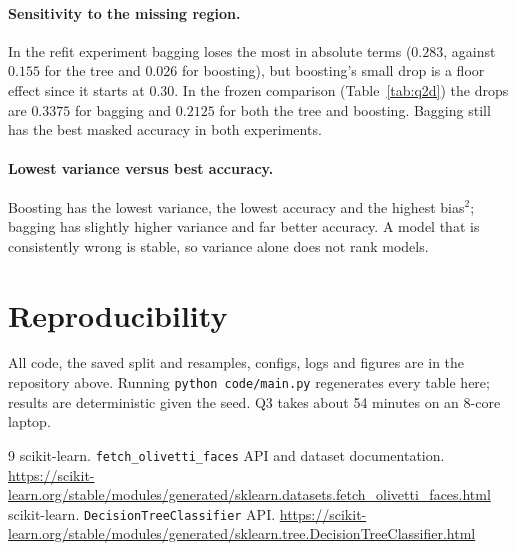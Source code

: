 \documentclass[10pt,twocolumn,letterpaper]{article}
\begin{document}
\paragraph{Sensitivity to the missing region.}
In the refit experiment bagging loses the most in absolute terms ($0.283$, against $0.155$ for the tree and $0.026$ for boosting), but boosting's small drop is a floor effect since it starts at $0.30$.
In the frozen comparison (Table~\ref{tab:q2d}) the drops are $0.3375$ for bagging and $0.2125$ for both the tree and boosting. Bagging still has the best masked accuracy in both experiments.

\paragraph{Lowest variance versus best accuracy.}
Boosting has the lowest variance, the lowest accuracy and the highest bias$^2$; bagging has slightly higher variance and far better accuracy.
A model that is consistently wrong is stable, so variance alone does not rank models.

\section{Reproducibility}
All code, the saved split and resamples, configs, logs and figures are in the repository above. Running \texttt{python code/main.py} regenerates every table here;
results are deterministic given the seed. Q3 takes about 54 minutes on an 8-core laptop.

{\small
\begin{thebibliography}{9}
 scikit-learn. \texttt{fetch\_olivetti\_faces} API and dataset documentation. \url{https://scikit-learn.org/stable/modules/generated/sklearn.datasets.fetch_olivetti_faces.html}
 scikit-learn. \texttt{DecisionTreeClassifier} API. \url{https://scikit-learn.org/stable/modules/generated/sklearn.tree.DecisionTreeClassifier.html}
\end{thebibliography}}
\end{document}
